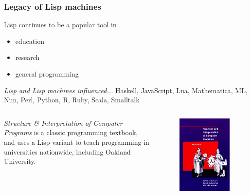 \documentclass{beamer}
\begin{document}
\begin{frame}
	\frametitle{Legacy of Lisp machines}
	Lisp continues to be a popular tool in
	\begin{itemize}
		\item education
		\item research
		\item general programming\newline
	\end{itemize}
	
		\textit{Lisp and Lisp machines influenced...}
		Haskell, JavaScript, Lua, Mathematica, ML, Nim,  Perl, Python, R, Ruby, Scala, Smalltalk
	
		\begin{columns}[c] %
			
	
	\textit{Structure \& Interpretation of Computer Programs} is a classic programming textbook,  and uses a Lisp variant to teach programming in universities nationwide, including Oakland University.\newline
	

			
			
			\begin{figure}
				\includegraphics[width=1\linewidth]{../img/SICP}
			\end{figure}
			

\end{columns}
\end{frame}
\end{document}
